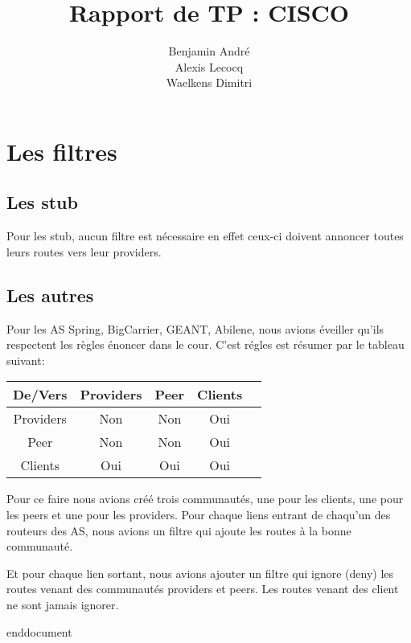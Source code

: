 \documentclass{article}
\author{Benjamin André\\Alexis Lecocq\\Waelkens Dimitri}
\title{Rapport de TP : CISCO}
\begin{document}
\maketitle


\section{Les filtres}

\subsection{Les stub}
Pour les stub, aucun filtre est nécessaire en effet ceux-ci doivent annoncer toutes leurs routes vers leur providers.

\subsection{Les autres}

Pour les AS Spring, BigCarrier, GEANT, Abilene, nous avions éveiller qu'ils respectent les règles énoncer dans le cour. C'est régles est résumer par le tableau suivant:



\begin{tabular}{|c|c|c|c|c|}
\hline
De/Vers & Providers & Peer & Clients \\
\hline
 Providers & Non & Non & Oui \\
\hline
 Peer & Non & Non & Oui \\
\hline
  Clients & Oui & Oui & Oui \\
\hline

\end{tabular}


Pour ce faire nous avions créé trois communautés, une pour les clients, une pour les peers et une pour les providers. Pour chaque liens entrant de chaqu'un des routeurs des AS, nous avions un filtre qui ajoute les routes à la bonne communauté.

Et pour chaque lien sortant, nous avions ajouter un filtre qui ignore (deny) les routes venant des communautés providers et peers.
Les routes venant des client ne sont jamais ignorer.

end{document}
\end{document}
